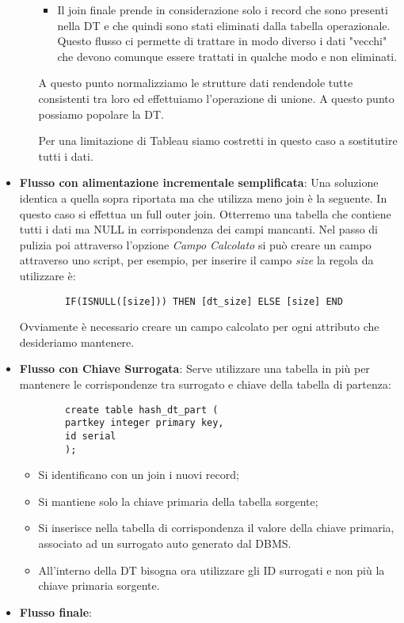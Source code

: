 \begin{itemize}
\begin{itemize}
\begin{itemize}
			\item Il join finale prende in considerazione solo i record che sono presenti nella DT e che quindi sono stati eliminati dalla tabella operazionale. Questo flusso ci permette di trattare in modo diverso i dati "vecchi" che devono comunque essere trattati in qualche modo e non eliminati.
		\end{itemize}
		A questo punto normalizziamo le strutture dati rendendole tutte consistenti tra loro ed effettuiamo l'operazione di unione. A questo punto possiamo popolare la DT.
		\begin{warn}
			Per una limitazione di Tableau siamo costretti in questo caso a sostitutire tutti i dati.
		\end{warn}
	\end{itemize}
	\item \textbf{Flusso con alimentazione incrementale semplificata}:
	Una soluzione identica a quella sopra riportata ma che utilizza meno join è la seguente.
	In questo caso si effettua un full outer join. Otterremo una tabella che contiene tutti i dati ma NULL in corrispondenza dei campi mancanti. Nel passo di pulizia poi attraverso l'opzione \textit{Campo Calcolato} si può creare un campo attraverso uno script, per esempio, per inserire il campo \textit{size} la regola da utilizzare è:
	\begin{verbatim}
		IF(ISNULL([size])) THEN [dt_size] ELSE [size] END
	\end{verbatim}
	Ovviamente è necessario creare un campo calcolato per ogni attributo che desideriamo mantenere.
	\item \textbf{Flusso con Chiave Surrogata}:
	Serve utilizzare una tabella in più per mantenere le corrispondenze tra surrogato e chiave della tabella di partenza:
	\begin{verbatim}
		create table hash_dt_part (
		partkey integer primary key,
		id serial
		);
	\end{verbatim}
	\begin{itemize}
		\item Si identificano con un join i nuovi record;
		\item Si mantiene solo la chiave primaria della tabella sorgente;
		\item Si inserisce nella tabella di corrispondenza il valore della chiave primaria, associato ad un surrogato auto generato dal DBMS.
		\item All'interno della DT bisogna ora utilizzare gli ID surrogati e non più la chiave primaria sorgente.
	\end{itemize}
	\item \textbf{Flusso finale}:
\end{itemize}

\newpage
